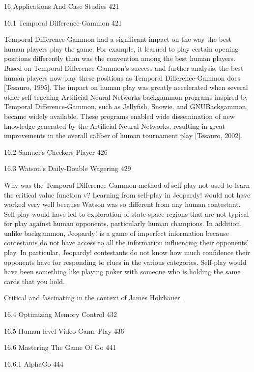 16 Applications And Case Studies 421



16.1 Temporal Difference-Gammon 421

Temporal Difference-Gammon had a significant impact on the way the best human players play the game. For example, it learned to play certain opening positions differently than was the convention among the best human players. Based on Temporal Difference-Gammon's success and further analysis, the best human players now play these positions as Temporal Difference-Gammon does [Tesauro, 1995]. The impact on human play was greatly accelerated when several other self-teaching Artificial Neural Networks backgammon programs inspired by Temporal Difference-Gammon, such as Jellyfish, Snowie, and GNUBackgammon, became widely available. These programs enabled wide dissemination of new knowledge generated by the Artificial Neural Networks, resulting in great improvements in the overall caliber of human tournament play [Tesauro, 2002].

16.2 Samuel's Checkers Player 426



16.3 Watson's Daily-Double Wagering 429

Why was the Temporal Difference-Gammon method of self-play not used to learn the critical value function v? Learning from self-play in Jeopardy! would not have worked very well because Watson was so different from any human contestant. Self-play would have led to exploration of state space regions that are not typical for play against human opponents, particularly human champions. In addition, unlike backgammon, Jeopardy! is a game of imperfect information because contestants do not have access to all the information influencing their opponents' play. In particular, Jeopardy! contestants do not know how much confidence their opponents have for responding to clues in the various categories. Self-play would have been something like playing poker with someone who is holding the same cards that you hold.

Critical and fascinating in the context of James Holzhauer.

16.4 Optimizing Memory Control 432



16.5 Human-level Video Game Play 436



16.6 Mastering The Game Of Go 441



16.6.1 AlphaGo 444



